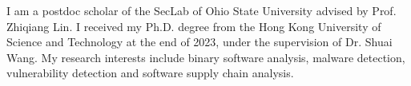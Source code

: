 I am a postdoc scholar of the SecLab of Ohio State University advised by Prof. Zhiqiang Lin. I received my Ph.D. degree from the Hong Kong University of Science and Technology at the end of 2023, under the supervision of Dr. Shuai Wang. My research interests include binary software analysis, malware detection, vulnerability detection and software supply chain analysis.
